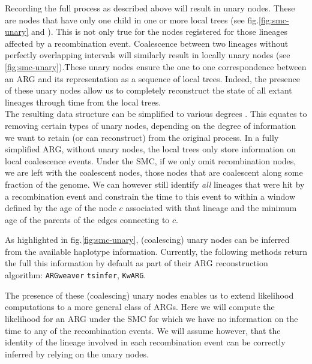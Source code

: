 \documentclass{article}
\newcommand{\tsinfer}[0]{\texttt{tsinfer}}
\newcommand{\kwarg}[0]{\texttt{KwARG}}
\newcommand{\argweaver}[0]{\texttt{ARGweaver}}
\begin{document}
Recording the full process as described above will result in unary nodes.
These are nodes that have only one child in one or more local trees 
(see fig.\ref{fig:smc-unary} and \citet{Wong-2023}). This is not only true 
for the nodes registered for those lineages affected by a recombination event. 
Coalescence between two lineages without perfectly 
overlapping intervals will similarly result in locally 
unary nodes (see \ref{fig:smc-unary}).These unary nodes ensure the one 
to one correspondence between an ARG and its 
representation as a sequence of local trees. 
Indeed, the presence of these unary nodes allow us to completely reconstruct 
the state of all extant lineages through time from the local trees.\\


The resulting data structure can be simplified to various degrees \citep{Wong-2023}. 
This equates to removing certain types of unary nodes, 
depending on the degree of information 
we want to retain (or can reconstruct) from the original process. 
In a fully simplified ARG, without unary nodes, 
the local trees only store information on local coalescence events.
Under the SMC, if we only omit recombination nodes, %
we are left with the coalescent nodes, those nodes that are coalescent 
along some fraction of the genome. We can however still identify \emph{all} 
lineages that were hit by a recombination event and constrain the time to 
this event to within a window defined by the age of the node $c$ associated with that 
lineage and the minimum age of the parents of the edges connecting to $c$.

As highlighted in fig.\ref{fig:smc-unary}, (coalescing) unary nodes can be inferred 
from the available haplotype information. Currently, the following methods 
return the full this information by default as part of their ARG reconstruction algorithm: 
\argweaver \citep{rasmussen_genome-wide_2014} 
\tsinfer \citep{kelleher_inferring_2019}, 
\kwarg \citep{ignatieva_kwarg_2021}.

The presence of these (coalescing) unary nodes enables us to extend likelihood 
computations to a more general class of ARGs.
Here we will compute the likelihood for an ARG
under the SMC for which we have no information on the time to any 
of the recombination events. 
We will assume however, that the identity 
of the lineage involved in each recombination event can be correctly 
inferred by relying on the unary nodes.
\end{document}
